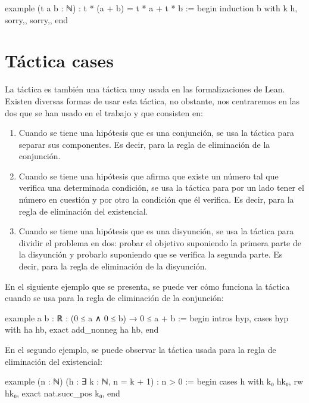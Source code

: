 \begin{leancode}
example (t a b : ℕ) : t * (a + b) = t * a + t * b :=
begin
  induction b with k h,
  {sorry,},
  {sorry,},
end
\end{leancode}

\section{Táctica cases}

La táctica  es también una táctica muy usada en las
formalizaciones de Lean. Existen diversas formas de usar esta táctica, no
obstante, nos centraremos en las dos que se han usado en el trabajo y que
consisten en:
\begin{enumerate}
\item Cuando se tiene una hipótesis que es una conjunción, se usa la
  táctica  para separar sus componentes. Es decir,
  para la regla de eliminación de la conjunción.

\item Cuando se tiene una hipótesis que afirma que existe un número tal que
  verifica una determinada condición, se usa la táctica 
  para por un lado tener el número en cuestión y por otro la condición que él
  verifica. Es decir, para la regla de eliminación del existencial.

\item Cuando se tiene una hipótesis que es una disyunción, se usa la táctica
   para dividir el problema en dos: probar el objetivo
  suponiendo la primera parte de la disyunción y probarlo suponiendo que
  se verifica la segunda parte. Es decir, para la regla de eliminación
  de la disyunción.
\end{enumerate}

En el siguiente ejemplo que se presenta, se puede ver cómo funciona la táctica
 cuando se usa para la regla de eliminación de la
conjunción:

\begin{leancode}
example {a b : ℝ} : (0 ≤ a ∧ 0 ≤ b) → 0 ≤ a + b :=
begin
  intros hyp,
  cases hyp with ha hb,
  exact add_nonneg ha hb,
end
\end{leancode}

En el segundo ejemplo, se puede observar la táctica 
usada para la regla de eliminación del existencial:
\begin{leancode}
example (n : ℕ) (h : ∃ k : ℕ, n = k + 1) : n > 0 :=
begin
  cases h with k₀ hk₀,
  rw hk₀,
  exact nat.succ_pos k₀,
end
\end{leancode}

